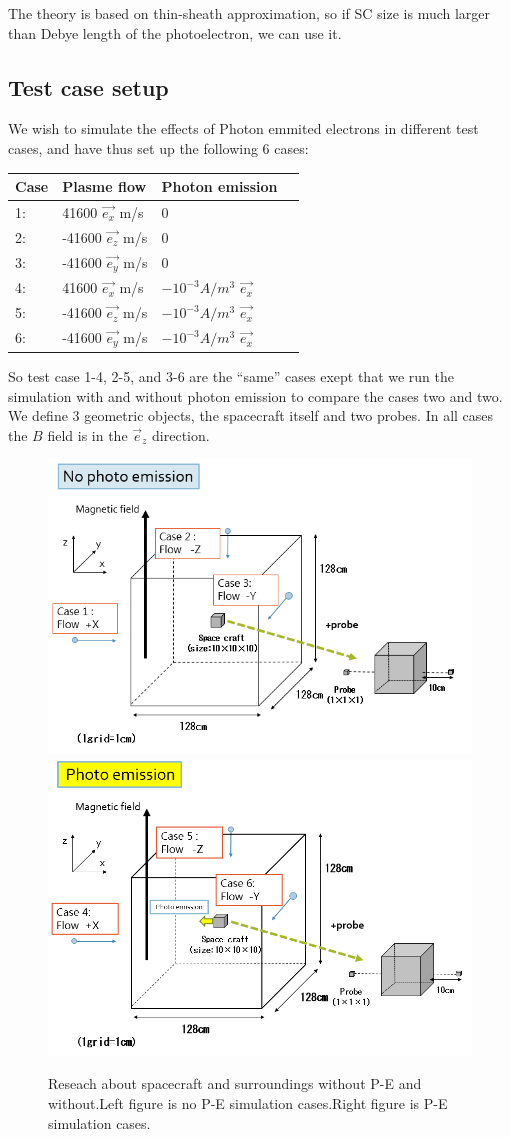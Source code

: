 The theory is based on thin-sheath approximation, so if SC size is much larger than Debye length of the photoelectron, we can use it.

\subsection{Test case setup}

We wish to simulate the effects of Photon emmited electrons in different test cases, and have thus set up the following
6 cases:
\begin{center}
    \begin{tabular}{ | l | l | l | p{5cm} |}
    \hline
    Case & Plasme flow & Photon emission  \\ \hline
     1: & 41600 $\vec{e_x}$ m/s  & 0 \\ \hline
     2: & -41600 $\vec{e_z}$ m/s & 0 \\ \hline
     3: & -41600 $\vec{e_y}$ m/s & 0 \\ \hline
     4: & 41600 $\vec{e_x}$ m/s & $-10^{-3} A/m^{3}$ $\vec{e_x}$\\ \hline
     5: & -41600 $\vec{e_z}$ m/s & $-10^{-3} A/m^{3}$ $\vec{e_x}$\\ \hline
     6: & -41600 $\vec{e_y}$ m/s & $-10^{-3} A/m^{3}$  $\vec{e_x}$\\
    \hline
    \end{tabular}
\end{center}

So test case 1-4, 2-5, and 3-6 are the ``same'' cases exept that we run the simulation with and without
photon emission to compare the cases two and two. We define 3 geometric objects, the spacecraft itself 
and two probes. In all cases the $B$ field is in the $\vec e_z$ direction.

\begin{figure}
        \includegraphics[width = 0.5 \textwidth]{images/picture_simulation1.png}
        \includegraphics[width = 0.5 \textwidth]{images/picture_simulation2-2.png}
        \caption{Reseach about spacecraft and surroundings without P-E and without.Left figure is no P-E simulation cases.Right figure is P-E simulation cases.}
    \end{figure}  

